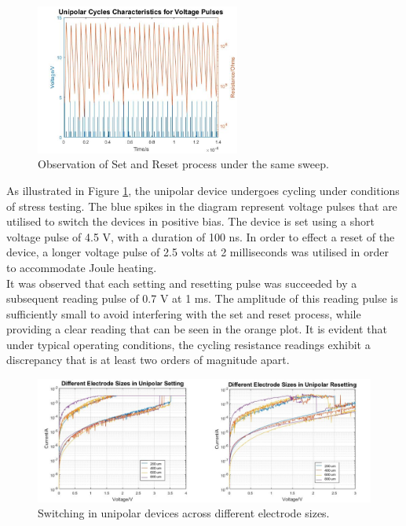 \begin{figure}[htbp!] 
    \centering    
    \includegraphics[width=0.6\textwidth]{Chapter3/Figs/j.png}
    \caption[Observation of Set and Reset process under the same sweep.]{Observation of Set and Reset process under the same sweep.}
    \label{fig:3j}
\end{figure}

\noindent As illustrated in Figure \ref{fig:3j}, the unipolar device undergoes cycling under conditions of stress testing. The blue spikes in the diagram represent voltage pulses that are utilised to switch the devices in positive bias. The device is set using a short voltage pulse of 4.5 V, with a duration of 100 ns. In order to effect a reset of the device, a longer voltage pulse of 2.5 volts at 2 milliseconds was utilised in order to accommodate Joule heating. \\

\noindent It was observed that each setting and resetting pulse was succeeded by a subsequent reading pulse of 0.7 V at 1 ms. The amplitude of this reading pulse is sufficiently small to avoid interfering with the set and reset process, while providing a clear reading that can be seen in the orange plot. It is evident that under typical operating conditions, the cycling resistance readings exhibit a discrepancy that is at least two orders of magnitude apart.\\

\begin{figure}[htbp!] 
    \centering    
    \includegraphics[width=1\textwidth]{Chapter3/Figs/k.png}
    \caption[Switching in unipolar devices across different electrode sizes.]{Switching in unipolar devices across different electrode sizes.}
    \label{fig:3k}
\end{figure}

